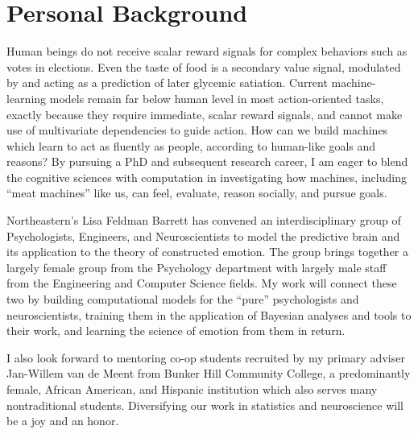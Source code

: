 \section*{Personal Background}

\begin{singlespace}
Human beings do not receive scalar reward signals for complex behaviors
such as votes in elections.  Even the taste of food is a secondary value
signal, modulated by and acting as a prediction of later glycemic
satiation.  Current machine-learning models remain far below human level
in most action-oriented tasks, exactly because they require immediate,
scalar reward signals, and cannot make use of multivariate dependencies
to guide action\cite{Lake2016}. How can we build machines which learn
to act as fluently as people, according to human-like goals and
reasons\cite{Lake2016,Railton2017}? By pursuing a PhD and subsequent
research career, I am eager to blend the cognitive sciences with
computation in investigating how machines, including ``meat machines''
like us, can feel, evaluate, reason socially, and pursue goals.
\end{singlespace}

\begin{singlespace}
\im\bi
Northeastern's Lisa Feldman Barrett has convened an interdisciplinary group
of Psychologists, Engineers, and Neuroscientists to model the predictive
brain and its application to the theory of constructed emotion\cite{Barrett2015,BarrettTheoryOfConstructed2017}.
The group brings together a largely female group from the Psychology
department with largely male staff from the Engineering and Computer
Science fields.  My work will connect these two by building computational
models for the ``pure'' psychologists and neuroscientists, training them
in the application of Bayesian analyses and tools to their work, and
learning the science of emotion from them in return.
\end{singlespace}

\begin{singlespace}
\bi
I also look forward to mentoring co-op students recruited by my primary
adviser Jan-Willem van de Meent from Bunker Hill Community College, a
predominantly female, African American, and Hispanic institution which also
serves many nontraditional students.  Diversifying our work in statistics
and neuroscience will be a joy and an honor.
\end{singlespace}

